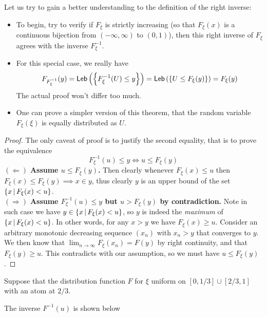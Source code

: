 \begin{hint}
Let us try to gain a better understanding to the definition of the right inverse: 
\begin{itemize}
    \item To begin, try to verify if $F_\xi$ is strictly increasing (so that $F_\xi(x)$ is a continuous bijection from $(-\infty,\infty)$ to $(0,1)$), then this right inverse of $F_\xi$ agrees with the inverse $F^{-1}_\xi$.
    \item For this special case, we really have
    \begin{align} \label{eq:prob_transform_cts}
        F_{F^{-1}_\xi}(y) = \mathsf{Leb}\left( \left\{ F^{-1}_\xi(U) \le y \right \} \right) = \mathsf{Leb}\left( \left\{ U \leq F_\xi(y) \right \} \right) = F_\xi(y)
    \end{align}
    The actual proof won't differ too much.
    \item One can prove a simpler version of this theorem, that the random variable $F_\xi(\xi)$ is equally distributed as $U$.
\end{itemize}
\end{hint}

\begin{proof}
The only caveat of proof is to justify the second equality, that is to prove the equivalence
\begin{equation*}
    F^{-1}_\xi(u) \leq y \iff u \leq F_\xi(y)
\end{equation*}
$(\Leftarrow)$ \textbf{Assume $u \leq F_\xi(y)$.} Then clearly whenever $F_\xi(x) \leq u$ then $F_\xi(x) \leq F_\xi(y) \implies x \in y$, thus clearly $y$ is an upper bound of the set $\left\{ x \,|\, F_\xi(x) < u \right \}$. \\

$(\Rightarrow)$ \textbf{Assume $F_\xi^{-1}(u) \leq y$ but $u > F_\xi(y)$ by contradiction.} Note in such case we have $y \in \left\{ x\,|\, F_\xi(x) < u \right \}$, so $y$ is indeed the \textit{maximum} of $\left\{ x\,|\, F_\xi(x) < u \right \}$. In other words, for any $x > y$ we have $F_\xi(x) \geq u$. Consider an arbitrary monotonic decreasing sequence $(x_n)$ with $x_n > y$ that converges to $y$. We then know that $\lim_{n\to \infty} F_\xi(x_n) = F(y)$ by right continuity, and that $F_\xi(y) \geq u$. This contradicts with our assumption, so we must have $u \leq F_\xi(y)$.
\end{proof}

\begin{example}
Suppose that the distribution function $F$ for $\xi$ uniform on $[0, 1/3] \cup [2/3, 1]$ with an atom at $2/3$. 
\begin{center}

\end{center}
The inverse $F^{-1}(u)$ is shown below
\begin{center}

\end{center}
\end{example}

